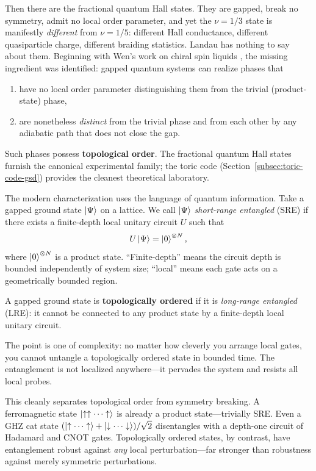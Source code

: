 Then there are the fractional quantum Hall states.  They are gapped, break no symmetry, admit no local order parameter, and yet the $\nu = 1/3$ state is manifestly \emph{different} from $\nu = 1/5$: different Hall conductance, different quasiparticle charge, different braiding statistics.  Landau has nothing to say about them.  Beginning with Wen's work on chiral spin liquids \cite{Wen1990TopologicalOrders}, the missing ingredient was identified: gapped quantum systems can realize phases that
\begin{enumerate}
    \item have no local order parameter distinguishing them from the trivial (product-state) phase,
    \item are nonetheless \emph{distinct} from the trivial phase and from each other by any adiabatic path that does not close the gap.
\end{enumerate}
Such phases possess \textbf{topological order}.  The fractional quantum Hall states furnish the canonical experimental family; the toric code (Section~\ref{subsec:toric-code-gsd}) provides the cleanest theoretical laboratory.

The modern characterization uses the language of quantum information.  Take a gapped ground state $\left|\Psi\right\rangle$ on a lattice.  We call $\left|\Psi\right\rangle$ \emph{short-range entangled} (SRE) if there exists a finite-depth local unitary circuit $U$ such that
\begin{equation}\label{eq:sre-def}
    U \left|\Psi\right\rangle = \left|0\right\rangle^{\otimes N},
\end{equation}
where $\left|0\right\rangle^{\otimes N}$ is a product state.  ``Finite-depth'' means the circuit depth is bounded independently of system size; ``local'' means each gate acts on a geometrically bounded region.

\begin{definition}\label{def:lre}
A gapped ground state is \textbf{topologically ordered} if it is \emph{long-range entangled} (LRE): it cannot be connected to any product state by a finite-depth local unitary circuit.
\end{definition}

\noindent The point is one of complexity: no matter how cleverly you arrange local gates, you cannot untangle a topologically ordered state in bounded time.  The entanglement is not localized anywhere---it pervades the system and resists all local probes.

This cleanly separates topological order from symmetry breaking.  A ferromagnetic state $\left|\uparrow \uparrow \cdots \uparrow\right\rangle$ is already a product state---trivially SRE.  Even a GHZ cat state $(\left|\uparrow\cdots\uparrow\right\rangle + \left|\downarrow\cdots\downarrow\right\rangle)/\sqrt{2}$ disentangles with a depth-one circuit of Hadamard and CNOT gates.  Topologically ordered states, by contrast, have entanglement robust against \emph{any} local perturbation---far stronger than robustness against merely symmetric perturbations.

